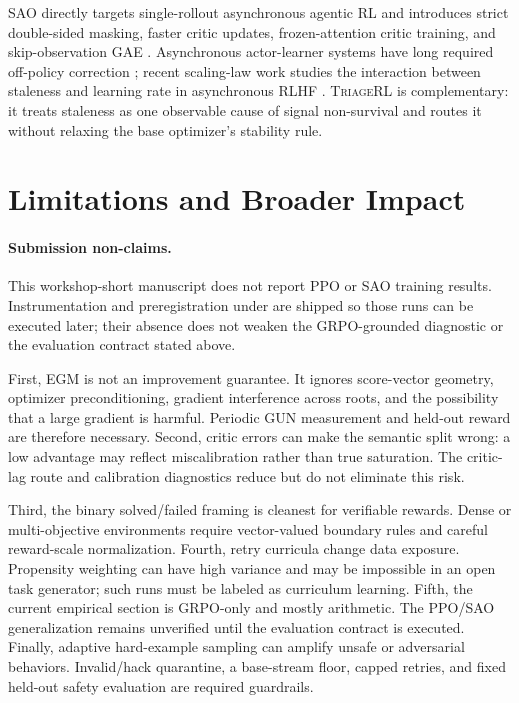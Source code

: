 \documentclass{article}
\newcommand{\method}{\textsc{TriageRL}\xspace}
\begin{document}
SAO directly targets single-rollout asynchronous agentic RL and introduces
strict double-sided masking, faster critic updates, frozen-attention critic
training, and skip-observation GAE \citep{hou2026sao}.  Asynchronous
actor-learner systems have long required off-policy correction
\citep{mnih2016asynchronous,espeholt2018impala}; recent scaling-law work studies
the interaction between staleness and learning rate in asynchronous RLHF
\citep{song2026staleness}.  \method is complementary: it treats staleness as
one observable cause of signal non-survival and routes it without relaxing the
base optimizer's stability rule.

\section{Limitations and Broader Impact}

\paragraph{Submission non-claims.}
This workshop-short manuscript does not report PPO or SAO training results.
Instrumentation and preregistration under
 are shipped so those
runs can be executed later; their absence does not weaken the GRPO-grounded
diagnostic or the evaluation contract stated above.

First, EGM is not an improvement guarantee.  It ignores score-vector geometry,
optimizer preconditioning, gradient interference across roots, and the
possibility that a large gradient is harmful.  Periodic GUN measurement and
held-out reward are therefore necessary.  Second, critic errors can make the
semantic split wrong: a low advantage may reflect miscalibration rather than
true saturation.  The critic-lag route and calibration diagnostics reduce but
do not eliminate this risk.

Third, the binary solved/failed framing is cleanest for verifiable rewards.
Dense or multi-objective environments require vector-valued boundary rules and
careful reward-scale normalization.  Fourth, retry curricula change data
exposure.  Propensity weighting can have high variance and may be impossible
in an open task generator; such runs must be labeled as curriculum learning.
Fifth, the current empirical section is GRPO-only and mostly arithmetic.  The
PPO/SAO generalization remains unverified until the evaluation contract is
executed.  Finally, adaptive hard-example sampling can amplify unsafe or
adversarial behaviors.  Invalid/hack quarantine, a base-stream floor, capped
retries, and fixed held-out safety evaluation are required guardrails.
\end{document}
